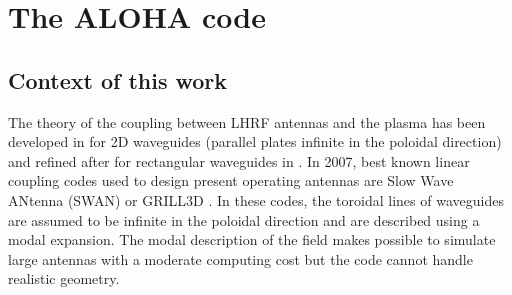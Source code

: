 \clearpage
\section{The ALOHA code}\label{sec:ALOHA}
\subsection{Context of this work}
The theory of the coupling between LHRF antennas and the plasma has been developed in  for 2D waveguides (parallel plates infinite in the poloidal direction) and refined after for rectangular waveguides in . In 2007, best known linear coupling codes used to design present operating antennas are Slow Wave ANtenna (SWAN)  or GRILL3D . In these codes, the toroidal lines of waveguides are assumed to be infinite in the poloidal direction and are described using a modal expansion. The modal description of the field makes possible to simulate large antennas with a moderate computing cost but the code cannot handle realistic geometry.

